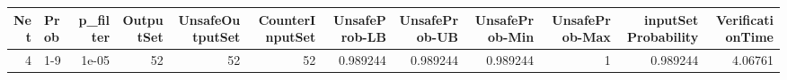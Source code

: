 \begin{tabular}{rlrrrrrrrrrr}
\hline
   Net & Prob   &   p\_filter &   OutputSet &   UnsafeOutputSet &   CounterInputSet &   UnsafeProb-LB &   UnsafeProb-UB &   UnsafeProb-Min &   UnsafeProb-Max &   inputSet Probability &   VerificationTime \\
\hline
     4 & 1-9    &      1e-05 &          52 &                52 &                52 &        0.989244 &        0.989244 &         0.989244 &                1 &               0.989244 &            4.06761 \\
\hline
\end{tabular}
